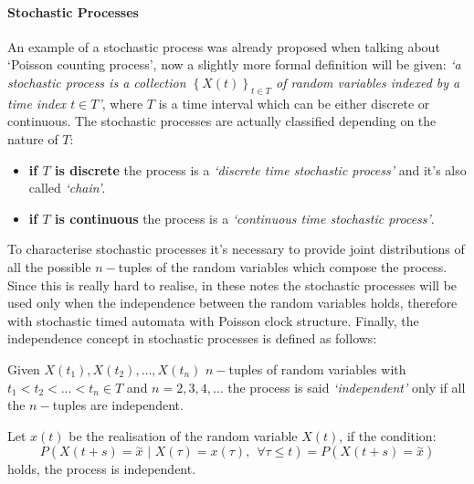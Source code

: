 \documentclass[12pt,a4paper]{article}
\begin{document}
\paragraph{Stochastic Processes}
An example of a stochastic process was already proposed when talking about `Poisson counting process', now a slightly more formal definition will be given: \emph{`a stochastic process is a collection $\left\lbrace X\left(t\right) \right\rbrace_{t\in T} $
of random variables indexed by a time index $t\in T$'}, where $T$ is a time interval which can be either discrete or continuous.
The stochastic processes are actually classified depending on the nature of $T$:
\begin{itemize}
\item \textbf{if $T$ is discrete} the process is a \emph{`discrete time stochastic process'} 
and it's also called \emph{`chain'}.
\item \textbf{if $T$ is continuous} the process is a \emph{`continuous time stochastic process'}.
\end{itemize}
To characterise stochastic processes it's necessary to provide joint distributions of all the possible $n-$tuples of the random variables which compose the process. Since this is really hard to realise, in these notes the stochastic processes will be used
only when the independence between the random variables holds, therefore with stochastic timed automata with Poisson clock structure. Finally, the independence concept in stochastic processes is defined as follows:

\bigskip
\noindent 
Given $X(t_1), X(t_2),\dots, X(t_n)$ $n-$tuples of random variables with $t_1<t_2<\dots<t_n \in T$ and $n=2,3,4,\dots$ the process is said \emph{`independent'} only if all the $n-$tuples are independent. 

\bigskip
\noindent 
Let $x(t)$ be the realisation of the random variable $X(t)$, if the condition:
$$
P\left(X\left(t+s\right)=\overset{\sim}{x}\hspace{4pt}|\hspace{4pt}X\left(\tau\right)=
x\left(\tau\right),\hspace{5pt}\forall\tau\leq t\right)=
P\left(X\left(t+s\right)=\overset{\sim}{x} \right)
$$
holds, the process is independent.
\end{document}
